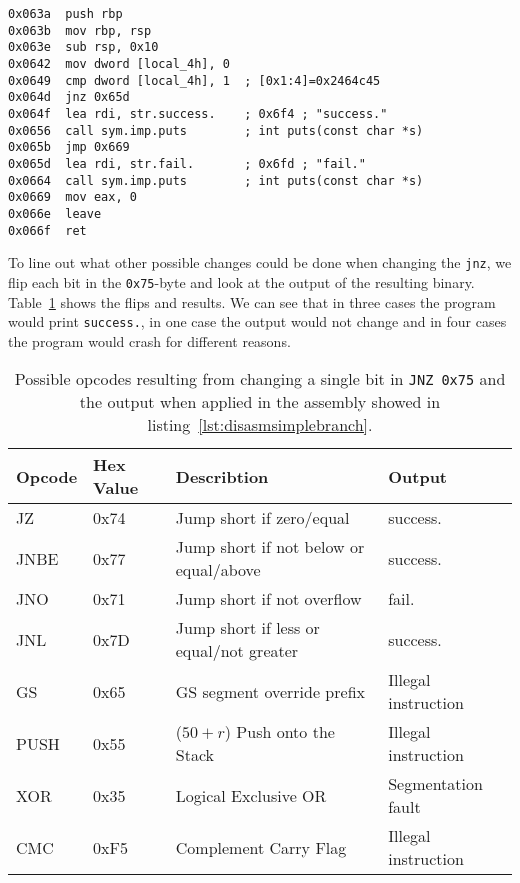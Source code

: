 \begin{minipage}{\linewidth}
\begin{lstlisting}[style=nasm,
                   caption={Disassemby of the main function created by the
code in listing~\ref{lst:csimbranch}. Shows machine code at given address
inside the ELF file, starting at \texttt{0x063a}.},
                   label={lst:disasmsimplebranch}]
0x063a  push rbp
0x063b  mov rbp, rsp
0x063e  sub rsp, 0x10
0x0642  mov dword [local_4h], 0
0x0649  cmp dword [local_4h], 1  ; [0x1:4]=0x2464c45
0x064d  jnz 0x65d
0x064f  lea rdi, str.success.    ; 0x6f4 ; "success."
0x0656  call sym.imp.puts        ; int puts(const char *s)
0x065b  jmp 0x669
0x065d  lea rdi, str.fail.       ; 0x6fd ; "fail."
0x0664  call sym.imp.puts        ; int puts(const char *s)
0x0669  mov eax, 0
0x066e  leave
0x066f  ret
\end{lstlisting}
\end{minipage}

To line out what other possible changes could be done when changing the
\texttt{jnz}, we flip each bit in the \texttt{0x75}-byte and look at the output
of the resulting binary. Table~\ref{tab:jnzflips} shows the flips and results.
We can see that in three cases the program would print \texttt{success.}, in one
case the output would not change and in four cases the program would crash for
different reasons.

\begin{table}[]
\begin{tabular}{|l|l|l|l|}
\hline
Opcode & Hex Value & Describtion                                           &
Output              \\ \hline
JZ     & 0x74      & Jump short if zero/equal                              &
success.            \\ \hline
JNBE   & 0x77      & Jump short if not below or equal/above                &
success.            \\ \hline
JNO    & 0x71      & Jump short if not overflow                            &
fail.               \\ \hline
JNL    & 0x7D      & Jump short if less or equal/not greater               &
success.            \\ \hline
GS     & 0x65      & GS segment override prefix                            &
Illegal instruction \\ \hline
PUSH   & 0x55      & ($50+r$) Push onto the Stack &
Illegal instruction \\ \hline
XOR    & 0x35      & Logical Exclusive OR                                  &
Segmentation fault  \\ \hline
CMC    & 0xF5      & Complement Carry Flag                                 &
Illegal instruction \\ \hline
\end{tabular}
\caption{Possible opcodes resulting from changing a single bit in
\texttt{JNZ}~\texttt{0x75} and the output when applied in the assembly showed in
listing~\ref{lst:disasmsimplebranch}.}
\label{tab:jnzflips}
\end{table}

